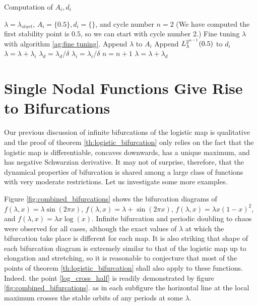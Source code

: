 \begin{algorithm}
	\caption{Computation of $A_i, d_i$}
	\begin{algorithmic}[1]
		\State $\lambda = \lambda_{start}$, $A_i = \{0.5\}, d_i = \{\}$, and cycle number $n = 2$ (We have computed the first stability point is $0.5$, so we can start with cycle number $2$.)
		  
			\State Fine tuning $\lambda$ with algorithm \ref{ag:fine tuning}.
			\State Append $\lambda$ to $A_i$ 
			\State Append $L_{\lambda}^{2^{n-1}}(0.5)$ to $d_i$ 
			\State $\lambda = \lambda + \lambda_{i}$
			\State $\lambda_{d} = \lambda_d / \delta$  
			\State $\lambda_{i} = \lambda_i / \delta$
			\State $n = n + 1$
		\EndIf
		\State $\lambda = \lambda + \lambda_d$
		\EndWhile
	\end{algorithmic}
	\label{ag:compute A_i}
\end{algorithm}

\section{Single Nodal Functions Give Rise to Bifurcations}

Our previous discussion of infinite bifurcations of the logistic map is qualitative and the proof of theorem \ref{th:logistic_bifurcation} only relies on the fact that the logistic map is differentiable, concaves downwards, has a unique maximum, and has negative Schwarzian derivative. 
It may not of surprise, therefore, that the dynamical properties of bifurcation is shared among a large class of functions with very moderate restrictions.
Let us investigate some more examples.

Figure \ref{fig:combined_bifurcations} shows the bifurcation diagrams of $f(\lambda, x) = \lambda \sin(2\pi x)$, $f(\lambda, x) = \lambda + \sin(2\pi x)$, $f(\lambda, x) = \lambda x(1-x)^2$, and $f(\lambda, x) = \lambda x \log(x)$.
Infinite bifurcation and periodic doubling to chaos were observed for all cases, although the exact values of $\lambda$ at which the bifurcation take place is different for each map.
It is also striking that shape of each bifurcation diagram is extremely similar to that of the logistic map up to elongation and stretching, so it is reasonable to conjecture that most of the points of theorem \ref{th:logistic_bifurcation} shall also apply to these functions.
Indeed. the point \ref{log_cross_half} is readily demonstrated by figure \ref{fig:combined_bifurcations}.
as in each subfigure the horizontal line at the local maximum crosses the stable orbits of any periods at some $\lambda$.

